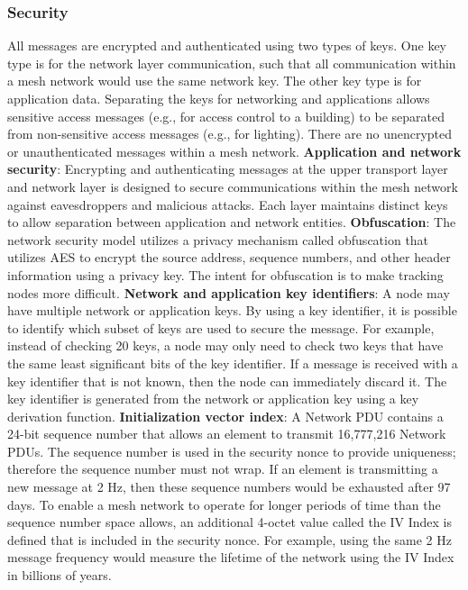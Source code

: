\documentclass[\main/main.tex]{subfiles}
\begin{document}
\subsubsection{Security}
All messages are encrypted and authenticated using two types of keys. One key type is for the network layer communication, such that all communication within a mesh network would use the same network key. The other key type is for application data. Separating the keys for networking and applications allows sensitive access messages (e.g., for access control to a building) to be separated from non-sensitive access messages (e.g., for lighting). There are no unencrypted or unauthenticated messages within a mesh network.
\newline\newline
\textbf{Application and network security}: Encrypting and authenticating messages at the upper transport layer and network layer is designed to secure communications within the mesh network against eavesdroppers and malicious attacks. Each layer maintains distinct keys to allow separation between application and network entities.
\newline\newline
\textbf{Obfuscation}: The network security model utilizes a privacy mechanism called obfuscation that utilizes AES to encrypt the source address, sequence numbers, and other header information using a privacy key. The intent for obfuscation is to make tracking nodes more difficult.
\newline\newline
\textbf{Network and application key identifiers}: A node may have multiple network or application keys. By using a key identifier, it is possible to identify which subset of keys are used to secure the message. For example, instead of checking 20 keys, a node may only need to check two keys that have the same least significant bits of the key identifier. If a message is received with a key identifier that is not known, then the node can immediately discard it. The key identifier is generated from the network or application key using a key derivation function.
\newline\newline
\textbf{Initialization vector index}: A Network PDU contains a 24-bit sequence number that allows an element to transmit 16,777,216 Network PDUs. The sequence number is used in the security nonce to provide uniqueness; therefore the sequence number must not wrap. If an element is transmitting a new message at 2 Hz, then these sequence numbers would be exhausted after 97 days. To enable a mesh network to operate for longer periods of time than the sequence number space allows, an additional 4-octet value called the IV Index is defined that is included in the security nonce. For example, using the same 2 Hz message frequency would measure the lifetime of the network using the IV Index in billions of years.
\end{document}
